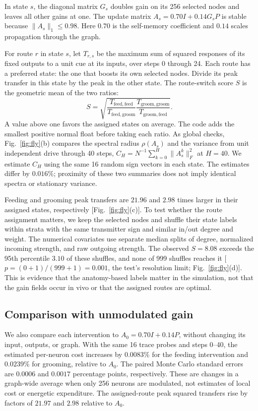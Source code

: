 \documentclass[aps,10pt,onecolumn,superscriptaddress,nofootinbib,
  longbibliography,amsmath,amssymb,floatfix]{revtex4-2}
\begin{document}
In state \(s\), the diagonal matrix \(G_s\) doubles gain on its
256 selected nodes and leaves all other gains at one. The update
matrix \(A_s=0.70I+0.14G_sP\) is stable because
\(\|A_s\|_1\le0.98\). Here \(0.70\) is the self-memory coefficient
and \(0.14\) scales propagation through the graph.

For route \(r\) in state \(s\), let \(T_{r,s}\) be the maximum
sum of squared responses of its fixed outputs to a unit cue at
its inputs, over steps 0 through 24. Each route has a preferred
state: the one that boosts its own selected nodes. Divide its
peak transfer in this state by the peak in the other state.
The route-switch score \(S\) is the geometric mean of the two ratios:
\begin{equation}
  S=\sqrt{\frac{T_{\mathrm{feed},\mathrm{feed}}}
                 {T_{\mathrm{feed},\mathrm{groom}}}
           \frac{T_{\mathrm{groom},\mathrm{groom}}}
                 {T_{\mathrm{groom},\mathrm{feed}}}} .
  \label{eq:switch}
\end{equation}
A value above one favors the assigned states on average. The code
adds the smallest positive normal float before taking each ratio.
As global checks, Fig.~\ref{fig:fly}(b) compares the spectral radius
\(\rho(A_s)\) and the variance from unit independent drive through
40 steps, \(C_H=N^{-1}\sum_{k=0}^{H}\|A_s^k\|_F^2\) at \(H=40\).
We estimate \(C_H\) using the same 16 random sign vectors in each
state. The estimates differ by \(0.016\%\); proximity of these two
summaries does not imply identical spectra or stationary variance.

Feeding and grooming peak transfers are \(21.96\) and \(2.98\)
times larger in their assigned states, respectively
[Fig.~\ref{fig:fly}(c)]. To test whether the route assignment
matters, we keep the selected nodes and shuffle their state labels
within strata with the same transmitter sign and similar in/out
degree and weight. The numerical covariates use separate median
splits of degree, normalized incoming strength, and raw outgoing
strength. The observed \(S=8.08\) exceeds the 95th percentile
\(3.10\) of these shuffles, and none of 999 shuffles reaches it
[\(p=(0+1)/(999+1)=0.001\), the test's resolution limit;
Fig.~\ref{fig:fly}(d)]. This is evidence that the anatomy-based
labels matter in the simulation, not that the gain fields occur
in vivo or that the assigned routes are optimal.

\subsection{Comparison with unmodulated gain}
We also compare each intervention to \(A_0=0.70I+0.14P\), without
changing its input, outputs, or graph. With the same 16 trace probes
and steps 0--40, the estimated per-neuron cost increases by \(0.0083\%\)
for the feeding intervention and \(0.0239\%\) for grooming, relative
to \(A_0\). The paired Monte Carlo standard errors are \(0.0006\) and
\(0.0017\) percentage points, respectively. These are changes in a
graph-wide average when only 256 neurons are modulated, not estimates
of local cost or energetic expenditure. The assigned-route peak squared
transfers rise by factors of \(21.97\) and \(2.98\) relative to \(A_0\).
\end{document}
